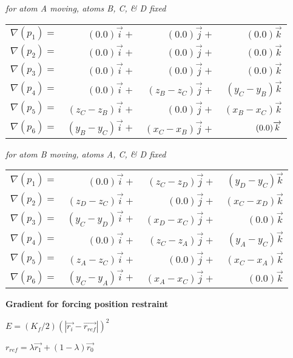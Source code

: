 {\em for atom A moving, atoms B, C, \& D fixed}

\begin{tabular}{lrrr}
$\nabla (p_{1})=$ & $(0.0)\overrightarrow{i}+$ & $(0.0)\overrightarrow{j}+$
& $(0.0)\overrightarrow{k}$ \\ 
$\nabla (p_{2})=$ & $(0.0)\overrightarrow{i}+$ & $(0.0)\overrightarrow{j}+$
& $(0.0)\overrightarrow{k}$ \\ 
$\nabla (p_{3})=$ & $(0.0)\overrightarrow{i}+$ & $(0.0)\overrightarrow{j}+$
& $(0.0)\overrightarrow{k}$ \\ 
$\nabla (p_{4})=$ & $(0.0)\overrightarrow{i}+$ & $(z_{B}-z_{C})
\overrightarrow{j}+$ & $(y_{C}-y_{B})\overrightarrow{k}$ \\ 
$\nabla (p_{5})=$ & $(z_{C}-z_{B})\overrightarrow{i}+$ & $(0.0)
\overrightarrow{j}+$ & $(x_{B}-x_{C})\overrightarrow{k}$ \\ 
$\nabla (p_{6})=$ & $(y_{B}-y_{C})\overrightarrow{i}+$ & $(x_{C}-x_{B})
\overrightarrow{j}+$ & $(0.0)\nolinebreak \bigskip \overrightarrow{k}$
\end{tabular}
\bigskip 

{\em for atom B moving, atoms A, C, \& D fixed}

\begin{tabular}{lrrr}
$\nabla (p_{1})=$ & $(0.0)\overrightarrow{i}+$ & $(z_{C}-z_{D})
\overrightarrow{j}+$ & $(y_{D}-y_{C})\overrightarrow{k}$ \\ 
$\nabla (p_{2})=$ & $(z_{D}-z_{C})\overrightarrow{i}+$ & $(0.0)
\overrightarrow{j}+$ & $(x_{C}-x_{D})\overrightarrow{k}$ \\ 
$\nabla (p_{3})=$ & $(y_{C}-y_{D})\overrightarrow{i}+$ & $(x_{D}-x_{C})
\overrightarrow{j}+$ & $(0.0)\overrightarrow{k}$ \\ 
$\nabla (p_{4})=$ & $(0.0)\overrightarrow{i}+$ & $(z_{C}-z_{A})
\overrightarrow{j}+$ & $(y_{A}-y_{C})\overrightarrow{k}$ \\ 
$\nabla (p_{5})=$ & $(z_{A}-z_{C})\overrightarrow{i}+$ & $(0.0)
\overrightarrow{j}+$ & $(x_{C}-x_{A})\overrightarrow{k}$ \\ 
$\nabla (p_{6})=$ & $(y_{C}-y_{A})\overrightarrow{i}+$ & $(x_{A}-x_{C})
\overrightarrow{j}+$ & $(0.0)\overrightarrow{k}$
\end{tabular}

{\bf Gradient for forcing position restraint}

$E=(K_{f}/2)\left( \left| \overrightarrow{r_{i}}-\overrightarrow{r_{ref}}
\right| \right) ^{2}$

$r_{ref}=\lambda \overrightarrow{r_{1}}+\left( 1-\lambda \right) 
\overrightarrow{r_{0}}$

